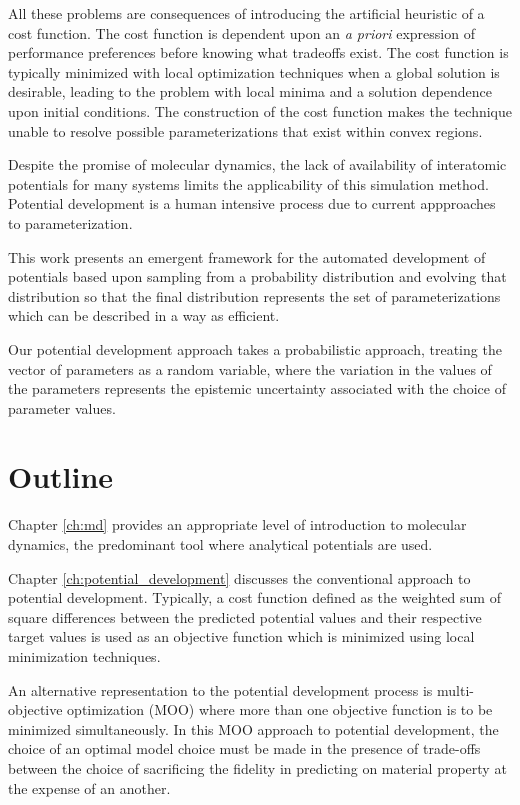 All these problems are consequences of introducing the artificial heuristic of a cost function.  The cost function is dependent upon an \emph{a priori} expression of performance preferences before knowing what tradeoffs exist.  The cost function is typically minimized with local optimization techniques when a global solution is desirable, leading to the problem with local minima and a solution dependence upon initial conditions.  The construction of the cost function makes the technique unable to resolve possible parameterizations that exist within convex regions.

Despite the promise of molecular dynamics, the lack of availability of interatomic potentials for many systems limits the applicability of this simulation method.  Potential development is a human intensive process due to current appproaches to parameterization.

This work presents an emergent framework for the automated development of potentials based upon sampling from a probability distribution and evolving that distribution so that the final distribution represents the set of parameterizations which can be described in a way as efficient.

Our potential development approach takes a probabilistic approach, treating the vector of parameters as a random variable, where the variation in the values of the parameters represents the epistemic uncertainty associated with the choice of parameter values.

\section{Outline}
Chapter \ref{ch:md} provides an appropriate level of introduction to molecular dynamics, the predominant tool where analytical potentials are used.

Chapter \ref{ch:potential_development} discusses the  conventional approach to potential development.  Typically, a cost function defined as the weighted sum of square differences between the predicted potential values and their respective target values is used as an objective function which is minimized using local minimization techniques.

An alternative representation to the potential development process is multi-objective optimization (MOO) where more than one objective function is to be minimized simultaneously.  In this MOO approach to potential development, the choice of an optimal model choice must be made in the presence of trade-offs between the choice of sacrificing the fidelity in predicting on material property at the expense of an another.

